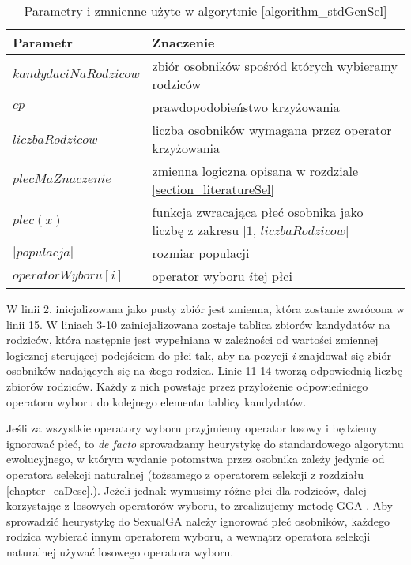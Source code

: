 \documentclass[twoside]{iisthesis}
\newcommand{\defacto}{\emph{de facto }}
\begin{document}
\begin{table}
	\caption{Parametry i zmnienne użyte w algorytmie \ref{algorithm_stdGenSel}}
	\label{table_stdGenSel}
	\begin{tabularx}{\linewidth}{lX}
		\hline
		\textbf{Parametr} & \textbf{Znaczenie} \\
		\hline
		\hline
		$kandydaciNaRodzicow$ & zbiór osobników spośród których wybieramy rodziców \\
		\hline
		$cp$ & prawdopodobieństwo krzyżowania \\
		\hline
		$liczbaRodzicow$ & liczba osobników wymagana przez operator krzyżowania \\
		\hline
		$plecMaZnaczenie$ & zmienna logiczna opisana w rozdziale \ref{section_literatureSel} \\
		\hline
		$plec(x)$ & funkcja zwracająca płeć osobnika jako liczbę z zakresu [$1$, $liczbaRodzicow$] \\
		\hline
		$|populacja|$ & rozmiar populacji \\
		\hline
		$operatorWyboru[i]$ & operator wyboru $i$tej płci \\
		\hline
	\end{tabularx}
\end{table}

W linii 2. inicjalizowana jako pusty zbiór jest zmienna, która zostanie zwrócona w linii 15.
W liniach 3-10 zainicjalizowana zostaje tablica zbiorów kandydatów na rodziców, która następnie jest wypełniana w zależności od wartości zmiennej logicznej sterującej podejściem do płci tak, aby na pozycji \textit{i} znajdował się zbiór osobników nadających się na \textit{i}tego rodzica.
Linie 11-14 tworzą odpowiednią liczbę zbiorów rodziców. Każdy z nich powstaje przez przyłożenie odpowiedniego operatoru wyboru do kolejnego elementu tablicy kandydatów.

Jeśli za wszystkie operatory wyboru przyjmiemy operator losowy i będziemy ignorować płeć, to \defacto  sprowadzamy heurystykę do standardowego algorytmu ewolucyjnego, w którym wydanie potomstwa przez osobnika zależy jedynie od operatora selekcji naturalnej (tożsamego z operatorem selekcji z rozdziału \ref{chapter_eaDesc}.).
Jeżeli jednak wymusimy różne płci dla rodziców, dalej korzystając z losowych operatorów wyboru, to zrealizujemy metodę GGA \cite{GGA}.
Aby sprowadzić heurystykę do SexualGA \cite{SexualGA} należy ignorować płeć osobników, każdego rodzica wybierać innym operatorem wyboru, a wewnątrz operatora selekcji naturalnej używać losowego operatora wyboru.
\end{document}
